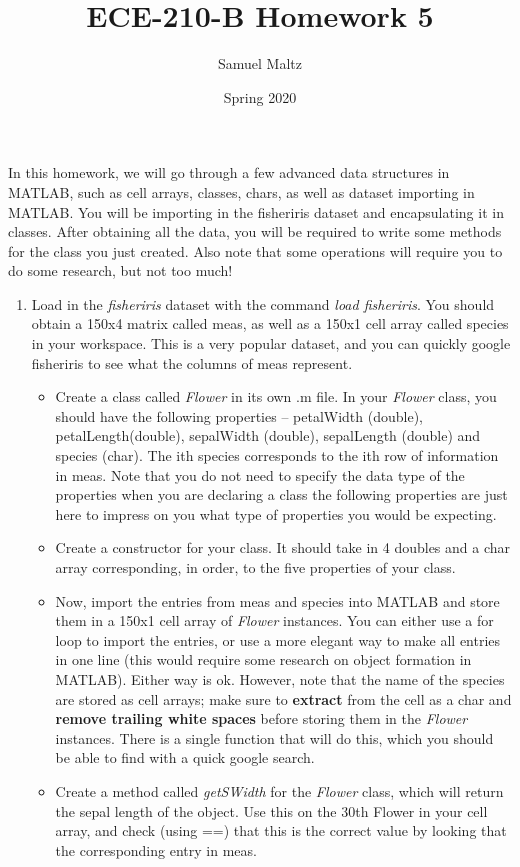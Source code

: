 \documentclass{article}
\title{ECE-210-B Homework 5}
\author{Samuel Maltz}
\date{Spring 2020}
\begin{document}
\noindent In this homework, we will go through a few advanced data structures in MATLAB, such as cell arrays, classes, chars, as well as dataset importing in MATLAB. You will be importing in the fisheriris dataset and encapsulating it in classes. After obtaining all the data, you will be required to write some methods for the class you just created. Also note that some operations will require you to do some research, but not too much!
\begin{enumerate}
\item Load in the \textit{fisheriris} dataset with the command \textit{load fisheriris}. You should obtain a 150x4 matrix called meas, as well as a 150x1 cell array called species in your workspace. This is a very popular dataset, and you can quickly google fisheriris to see what the columns of meas represent.
	\begin{itemize}
		\item Create a class called \textit{Flower} in its own .m file. In your \textit{Flower} class, you should have the following properties – petalWidth (double), petalLength(double), sepalWidth (double), sepalLength (double) and species (char). The ith species corresponds to the ith row of information in meas. Note that you do not need to specify the data type of the properties when you are declaring a class the following properties are just here to impress on you what type of properties you would be expecting.
		\item Create a constructor for your class. It should take in 4 doubles and a char array corresponding, in order, to the five properties of your class. 
		\item Now, import the entries from meas and species into MATLAB and store them in a 150x1 cell array of \textit{Flower} instances. You can either use a for loop to import the entries, or use a more elegant way to make all entries in one line (this would require some research on object formation in MATLAB). Either way is ok. However, note that the name of the species are stored as cell arrays; make sure to \textbf{extract} from the cell as a char and \textbf{remove trailing white spaces} before storing them in the \textit{Flower} instances. There is a single function that will do this, which you should be able to find with a quick google search.
		\item Create a method called \textit{getSWidth} for the \textit{Flower} class, which will return the sepal length of the object. Use this on the 30th Flower in your cell array, and check (using ==) that this is the correct value by looking that the corresponding entry in meas.

\end{itemize}
\end{enumerate}
\end{document}
